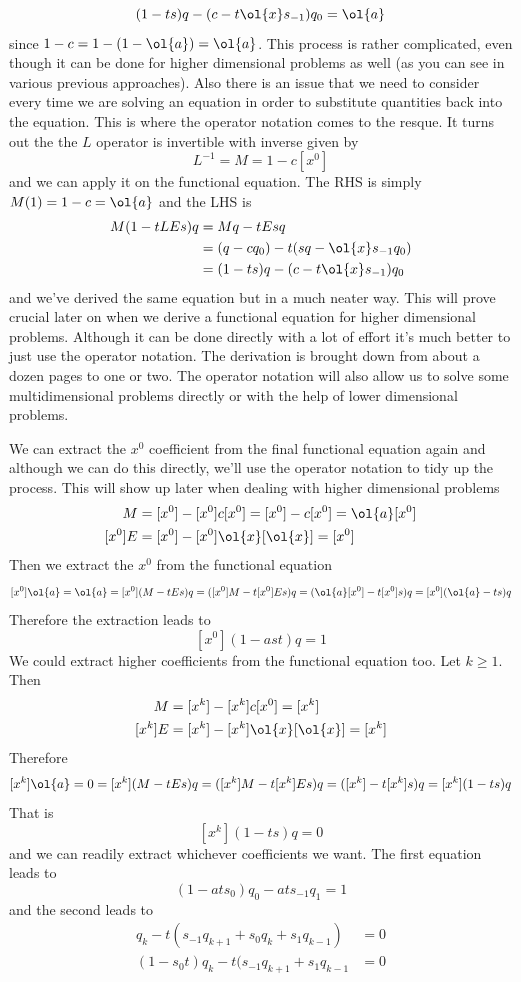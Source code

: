 \[
	(1-ts)q - (c -t\ol{x}s_{-1})q_0 = \ol{a}
\]
since $1 - c = 1 - (1-\ol{a}) = \ol{a}$. This process is rather complicated, even though it can be done for higher dimensional problems as well (as you can see in various previous approaches). Also there is an issue that we need to consider every time we are solving an equation in order to substitute quantities back into the equation. This is where the operator notation comes to the resque. It turns out the the $L$ operator is invertible with inverse given by
\[
	L^{-1} = M = 1 -  c[x^0]
\]
and we can apply it on the functional equation. The RHS is simply $M(1) = 1 - c = \ol{a}$ and the LHS is
\begin{align*}
	M(1-tLEs)q &= Mq - tEsq \\
	&= (q-cq_0) - t(sq - \ol{x}s_{-1}q_0) \\
	&= (1-ts)q - (c-t\ol{x}s_{-1})q_0 
\end{align*}
and we've derived the same equation but in a much neater way. This will prove crucial later on when we derive a functional equation for higher dimensional problems. Although it can be done directly with a lot of effort it's much better to just use the operator notation. The derivation is brought down from about a dozen pages to one or two. The operator notation will also allow us to solve some multidimensional problems directly or with the help of lower dimensional problems.

We can extract the $x^0$ coefficient from the final functional equation again and although we can do this directly, we'll use the operator notation to tidy up the process. This will show up later when dealing with higher dimensional problems
\begin{align*}
	[x^0]M &= [x^0]-[x^0]c[x^0] = [x^0]-c[x^0] = \ol{a}[x^0]\\
	[x^0]E &= [x^0] - [x^0]\ol{x}[\ol{x}] = [x^0]
\end{align*}
Then we extract the $x^0$ from the functional equation
\[
	[x^0]\ol{a} = \ol{a} = [x^0](M - tEs)q = ([x^0]M - t[x^0]Es)q = (\ol{a}[x^0]-t[x^0]s)q = [x^0](\ol{a}-ts)q
\]
Therefore the extraction leads to
\[
	[x^0](1-ast)q = 1
\]
We could extract higher coefficients from the functional equation too. Let $k\ge 1$. Then
\begin{align*}
	[x^k]M &= [x^k]-[x^k]c[x^0] = [x^k]\\
	[x^k]E &= [x^k] - [x^k]\ol{x}[\ol{x}] = [x^k]
\end{align*}
Therefore
\[
	[x^k]\ol{a} = 0 = [x^k](M - tEs)q = ([x^k]M - t[x^k]Es)q = ([x^k] - t[x^k]s)q = [x^k](1-ts)q
\]
That is
\[
	[x^k](1-ts)q = 0
\]
and we can readily extract whichever coefficients we want. The first equation leads to
\[
	(1-ats_0)q_0-ats_{-1}q_1 = 1
\]
and the second leads to
\begin{align*}
	q_k - t(s_{-1}q_{k+1}+s_0q_k+s_1 q_{k-1}) &= 0\\
	 (1-s_0t) q_k -t(s_{-1}q_{k+1} + s_1 q_{k-1} &= 0
\end{align*}

